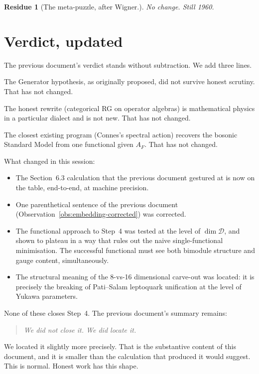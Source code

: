 \documentclass[11pt,a4paper]{article}
\newtheorem*{residue*}{Residue}
\begin{document}
\begin{residue*}[The meta-puzzle, after Wigner.]
No change. Still 1960.
\end{residue*}

\section{Verdict, updated}\label{sec:verdict-2}

The previous document's verdict stands without subtraction. We add three lines.

The Generator hypothesis, as originally proposed, did not survive honest
scrutiny. That has not changed.

The honest rewrite (categorical RG on operator algebras) is mathematical
physics in a particular dialect and is not new. That has not changed.

The closest existing program (Connes's spectral action) recovers the bosonic
Standard Model from one functional given $A_F$. That has not changed.

What changed in this session:
\begin{itemize}[leftmargin=2em]
  \item The Section~6.3 calculation that the previous document gestured at is
        now on the table, end-to-end, at machine precision.
  \item One parenthetical sentence of the previous document
        (Observation~\ref{obs:embedding-corrected}) was corrected.
  \item The functional approach to Step~4 was tested at the level of
        $\dim \mathcal{D}$, and shown to plateau in a way that rules out the
        naive single-functional minimisation. The successful functional must
        see both bimodule structure and gauge content, simultaneously.
  \item The structural meaning of the 8-vs-16 dimensional carve-out was
        located: it is precisely the breaking of Pati--Salam leptoquark
        unification at the level of Yukawa parameters.
\end{itemize}

None of these closes Step~4. The previous document's summary remains:

\begin{quote}\itshape
We did not close it. We did locate it.
\end{quote}

We located it slightly more precisely. That is the substantive content of this
document, and it is smaller than the calculation that produced it would
suggest. This is normal. Honest work has this shape.
\end{document}
